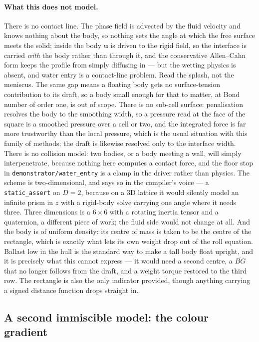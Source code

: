 \documentclass[11pt,a4paper]{article}
\newcommand{\code}[1]{\texttt{\small #1}}
\newcommand{\uu}{\bm{u}}
\begin{document}
\paragraph{What this does not model.} There is no contact line. The phase field is
advected by the fluid velocity and knows nothing about the body, so nothing sets
the angle at which the free surface meets the solid; inside the body $\uu$ is
driven to the rigid field, so the interface is carried \emph{with} the body rather
than through it, and the conservative Allen--Cahn form keeps the profile from
simply diffusing in --- but the wetting physics is absent, and water entry is a
contact-line problem. Read the splash, not the meniscus. The same gap means a
floating body gets no surface-tension contribution to its draft, so a body small
enough for that to matter, at Bond number of order one, is out of scope. There is
no sub-cell surface: penalisation resolves the body to the smoothing width, so a
pressure read at the face of the square is a smoothed pressure over a cell or two,
and the integrated force is far more trustworthy than the local pressure, which is
the usual situation with this family of methods; the draft is likewise resolved
only to the interface width. There is no collision model: two bodies, or a body
meeting a wall, will simply interpenetrate, because nothing here computes a
contact force, and the floor stop in \code{demonstrator/water\_entry} is a clamp in
the driver rather than physics. The scheme is two-dimensional, and says so in the
compiler's voice --- a \code{static\_assert} on $D=2$, because on a 3D lattice it
would silently model an infinite prism in $z$ with a rigid-body solve carrying one
angle where it needs three. Three dimensions is a $6\times6$ with a rotating
inertia tensor and a quaternion, a different piece of work; the fluid side would
not change at all. And the body is of uniform density: its centre of mass is taken
to be the centre of the rectangle, which is exactly what lets its own weight drop
out of the roll equation. Ballast low in the hull is the standard way to make a
tall body float upright, and it is precisely what this cannot express --- it would
need a second centre, a $\overline{BG}$ that no longer follows from the draft, and
a weight torque restored to the third row. The rectangle is also the only
indicator provided, though anything carrying a signed distance function drops
straight in.


\subsection{A second immiscible model: the colour gradient}\label{sec:colour}
\end{document}
